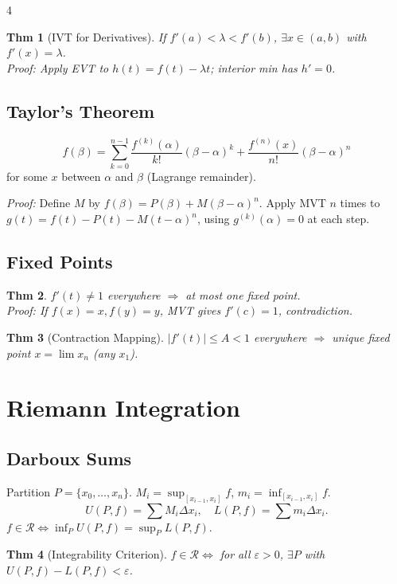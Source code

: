 \documentclass[9pt,landscape]{extarticle}
\newcommand{\eps}{\varepsilon}
\theoremstyle{compact}
\newtheorem*{thm}{Thm}
\begin{document}
\begin{multicols}{4}
\begin{thm}[IVT for Derivatives]
If $f'(a) < \lambda < f'(b)$, $\exists x \in (a,b)$ with $f'(x) = \lambda$.\\
\textit{Proof:} Apply EVT to $h(t) = f(t) - \lambda t$; interior min has $h'=0$.
\end{thm}

\subsection{Taylor's Theorem}
\[f(\beta) = \sum_{k=0}^{n-1}\frac{f^{(k)}(\alpha)}{k!}{(\beta-\alpha)}^k + \frac{f^{(n)}(x)}{n!}{(\beta-\alpha)}^n\]
for some $x$ between $\alpha$ and $\beta$ (Lagrange remainder).

\textit{Proof:} Define $M$ by $f(\beta) = P(\beta) + M(\beta-\alpha)^n$. Apply MVT $n$ times to $g(t) = f(t) - P(t) - M(t-\alpha)^n$, using $g^{(k)}(\alpha) = 0$ at each step.

\subsection{Fixed Points}
\begin{thm}
$f'(t) \neq 1$ everywhere $\Rightarrow$ at most one fixed point. \\
\textit{Proof:} If $f(x)=x, f(y)=y$, MVT gives $f'(c) = 1$, contradiction.
\end{thm}

\begin{thm}[Contraction Mapping]
$|f'(t)| \leq A < 1$ everywhere $\Rightarrow$ unique fixed point $x = \lim x_n$ (any $x_1$).
\end{thm}

\section{Riemann Integration}

\subsection{Darboux Sums}
Partition $P = \{x_0,\ldots,x_n\}$. $M_i = \sup_{[x_{i-1},x_i]}f$, $m_i = \inf_{[x_{i-1},x_i]}f$.
$$U(P,f) = \sum M_i\Delta x_i, \quad L(P,f) = \sum m_i\Delta x_i.$$
$f \in \mathscr{R} \Leftrightarrow \inf_P U(P,f) = \sup_P L(P,f)$.

\begin{thm}[Integrability Criterion]
$f \in \mathscr{R} \Leftrightarrow$ for all $\eps>0$, $\exists P$ with $U(P,f) - L(P,f) < \eps$.
\end{thm}


\end{multicols}
\end{document}
